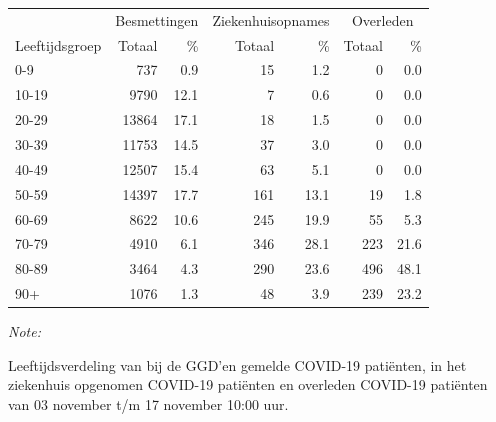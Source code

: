\documentclass[
  english,
  man,floatsintext]{apa6}
\begin{document}
\begin{table}[H]
\centering\begingroup\fontsize{11}{13}\selectfont

\begin{threeparttable}
\begin{tabular}{lrrrrrr}
\toprule
\multicolumn{1}{c}{ } & \multicolumn{2}{c}{Besmettingen} & \multicolumn{2}{c}{Ziekenhuisopnames} & \multicolumn{2}{c}{Overleden} \\
\cmidrule(l{3pt}r{3pt}){2-3} \cmidrule(l{3pt}r{3pt}){4-5} \cmidrule(l{3pt}r{3pt}){6-7}
Leeftijdsgroep & Totaal & \% & Totaal & \% & Totaal & \%\\
\midrule
0-9 & 737 & 0.9 & 15 & 1.2 & 0 & 0.0\\
10-19 & 9790 & 12.1 & 7 & 0.6 & 0 & 0.0\\
20-29 & 13864 & 17.1 & 18 & 1.5 & 0 & 0.0\\
30-39 & 11753 & 14.5 & 37 & 3.0 & 0 & 0.0\\
40-49 & 12507 & 15.4 & 63 & 5.1 & 0 & 0.0\\
50-59 & 14397 & 17.7 & 161 & 13.1 & 19 & 1.8\\
60-69 & 8622 & 10.6 & 245 & 19.9 & 55 & 5.3\\
70-79 & 4910 & 6.1 & 346 & 28.1 & 223 & 21.6\\
80-89 & 3464 & 4.3 & 290 & 23.6 & 496 & 48.1\\
90+ & 1076 & 1.3 & 48 & 3.9 & 239 & 23.2\\
\bottomrule
\end{tabular}
\begin{tablenotes}
\item \textit{Note: } 
\item Leeftijdsverdeling van bij de GGD’en gemelde COVID-19 patiënten, in het ziekenhuis opgenomen COVID-19 patiënten en overleden COVID-19 patiënten van 03 november t/m 17 november 10:00 uur.
\end{tablenotes}
\end{threeparttable}
\endgroup{}
\end{table}
\end{document}
